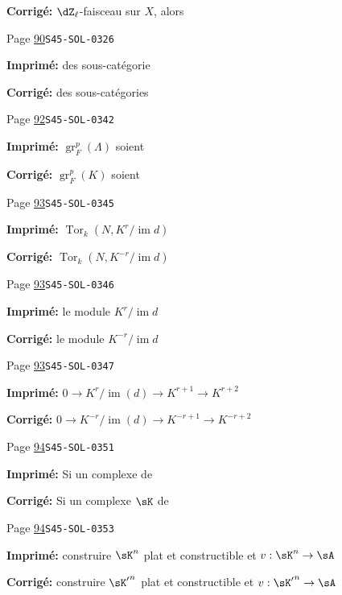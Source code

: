 \documentclass[oneside]{book}
\DeclareMathOperator{\gr}{gr}
\DeclareMathOperator{\im}{im}
\DeclareMathOperator{\tor}{Tor}
\theoremstyle{sga-source}
\theoremstyle{sga-source-dash}
\theoremstyle{sga-source-dotdash}
\theoremstyle{sga-source-number-note-dash}
\theoremstyle{sga-source-note-number-dotdash}
\theoremstyle{sga-source-example-dotdash}
\theoremstyle{sga-source-inline-number}
\theoremstyle{sga-source-bare-number}
\theoremstyle{sga-source}
\begin{document}
\begin{description}
\par\noindent\textbf{Corrigé:} $\dZ_\ell$-faisceau sur $X$, alors
\smallskip
\item[\hypertarget{apparatus:FR-0040}{40}] Page \hyperlink{printpage:fr:90}{90}\quad\texttt{S45-SOL-0326}
\par\noindent\textbf{Imprimé:} des sous-catégorie
\par\noindent\textbf{Corrigé:} des sous-catégories
\smallskip
\item[\hypertarget{apparatus:FR-0041}{41}] Page \hyperlink{printpage:fr:92}{92}\quad\texttt{S45-SOL-0342}
\par\noindent\textbf{Imprimé:} $\gr_F^p(\Lambda)$ soient
\par\noindent\textbf{Corrigé:} $\gr_F^p(K)$ soient
\smallskip
\item[\hypertarget{apparatus:FR-0042}{42}] Page \hyperlink{printpage:fr:93}{93}\quad\texttt{S45-SOL-0345}
\par\noindent\textbf{Imprimé:} \(\tor_k(N,K^r/\im d)\)
\par\noindent\textbf{Corrigé:} \(\tor_k(N,K^{-r}/\im d)\)
\smallskip
\item[\hypertarget{apparatus:FR-0043}{43}] Page \hyperlink{printpage:fr:93}{93}\quad\texttt{S45-SOL-0346}
\par\noindent\textbf{Imprimé:} le module $K^r/\im d$
\par\noindent\textbf{Corrigé:} le module $K^{-r}/\im d$
\smallskip
\item[\hypertarget{apparatus:FR-0044}{44}] Page \hyperlink{printpage:fr:93}{93}\quad\texttt{S45-SOL-0347}
\par\noindent\textbf{Imprimé:} \(0 \to K^r/\im(d) \to K^{r+1} \to K^{r+2}\)
\par\noindent\textbf{Corrigé:} \(0 \to K^{-r}/\im(d) \to K^{-r+1} \to K^{-r+2}\)
\smallskip
\item[\hypertarget{apparatus:FR-0045}{45}] Page \hyperlink{printpage:fr:94}{94}\quad\texttt{S45-SOL-0351}
\par\noindent\textbf{Imprimé:} Si un complexe de
\par\noindent\textbf{Corrigé:} Si un complexe $\sK$ de
\smallskip
\item[\hypertarget{apparatus:FR-0046}{46}] Page \hyperlink{printpage:fr:94}{94}\quad\texttt{S45-SOL-0353}
\par\noindent\textbf{Imprimé:} construire $\sK^n$ plat et constructible et $v:\sK^n\to \sA$
\par\noindent\textbf{Corrigé:} construire ${\sK'}^n$ plat et constructible et $v:{\sK'}^n\to \sA$

\end{description}
\end{document}
